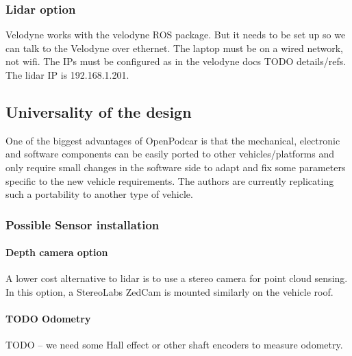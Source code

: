 \documentclass[a4paper]{article}
\begin{document}
\subsubsection{Lidar option}
Velodyne works with the velodyne ROS package. But it needs to be set up so we can talk to the Velodyne over ethernet.  The laptop must be on a wired network, not wifi.   The IPs must be configured as in the velodyne docs TODO details/refs.  The lidar IP is 192.168.1.201.


\subsection{Universality of the design}\label{h.q32f2nclh4e5}


One of the biggest advantages of OpenPodcar is that the mechanical, electronic and software components can be easily ported to other vehicles/platforms and only require small changes in the software side to adapt and fix some parameters specific to the new vehicle requirements. The authors are currently replicating such a portability to another type of vehicle. 

\subsubsection{Possible Sensor installation}

\paragraph{Depth camera option}
A lower cost alternative to lidar is to use a stereo camera for point cloud sensing. In this option, a StereoLabs ZedCam is mounted similarly on the vehicle roof.

\paragraph{TODO Odometry}
TODO -- we need some Hall effect or other shaft encoders to measure odometry.
\end{document}
